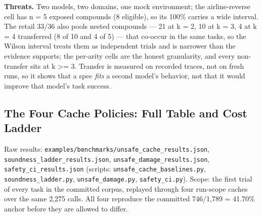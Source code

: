 \documentclass[
  11pt,
]{article}
\begin{document}
\textbf{Threats.} Two models, two domains, one mock environment; the
airline-reverse cell has n = 5 exposed compounds (8 eligible), so its
100\% carries a wide interval. The retail 33/36 also pools nested
compounds --- 21 at k = 2, 10 at k = 3, 4 at k = 4 transferred (8 of 10
and 4 of 5) --- that co-occur in the same tasks, so the Wilson interval
treats them as independent trials and is narrower than the evidence
supports; the per-arity cells are the honest granularity, and every
non-transfer sits at k \textgreater= 3. Transfer is measured on recorded
traces, not on fresh runs, so it shows that a spec \emph{fits} a second
model's behavior, not that it would improve that model's task success.

\subsection{The Four Cache Policies: Full Table and Cost
Ladder}\label{the-four-cache-policies-full-table-and-cost-ladder}

Raw results: \texttt{examples/benchmarks/unsafe\_cache\_results.json},
\texttt{soundness\_ladder\_results.json},
\texttt{unsafe\_damage\_results.json}, \texttt{safety\_ci\_results.json}
(scripts: \texttt{unsafe\_cache\_baselines.py},
\texttt{soundness\_ladder.py}, \texttt{unsafe\_damage.py},
\texttt{safety\_ci.py}). Scope: the first trial of every task in the
committed corpus, replayed through four run-scope caches over the same
2,275 calls. All four reproduce the committed 746/1,789 = 41.70\% anchor
before they are allowed to differ.
\end{document}
